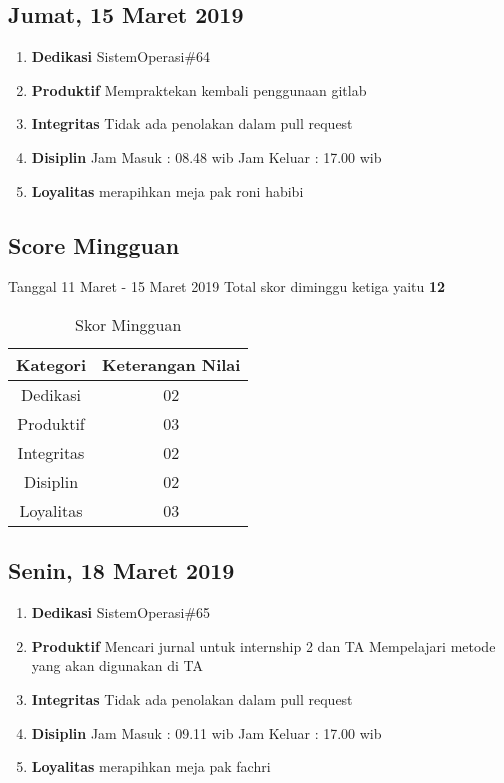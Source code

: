 \subsection{Jumat, 15 Maret 2019}
\begin{enumerate}
\item \textbf{Dedikasi}
\subitem SistemOperasi\#64
\item \textbf{Produktif}
\subitem Mempraktekan kembali penggunaan gitlab 
\item \textbf{Integritas}
\subitem Tidak ada penolakan dalam pull request
\item \textbf{Disiplin}
\subitem Jam Masuk : 08.48 wib
\subitem Jam Keluar : 17.00 wib
\item \textbf{Loyalitas}
\subitem merapihkan meja pak roni habibi
\end{enumerate}

\subsection{Score Mingguan} 
Tanggal 11 Maret - 15 Maret 2019 Total skor diminggu ketiga yaitu \textbf{12}

\begin{table}[h]
\caption{Skor Mingguan}
\centering
\begin{tabular}{|c|c|}
\hline
\textbf{Kategori}&\textbf{Keterangan Nilai}\\
\hline
Dedikasi&02\\
\hline
Produktif&03\\
\hline
Integritas&02\\
\hline
Disiplin&02\\
\hline
Loyalitas&03\\
\hline
\end{tabular}
\label{table : skor minggu ketiga}
\end{table}

\subsection{Senin, 18 Maret 2019}
\begin{enumerate}
\item \textbf{Dedikasi}
\subitem SistemOperasi\#65
\item \textbf{Produktif}
\subitem Mencari jurnal untuk internship 2 dan TA
\subitem Mempelajari metode yang akan digunakan di TA
\item \textbf{Integritas}
\subitem Tidak ada penolakan dalam pull request
\item \textbf{Disiplin}
\subitem Jam Masuk : 09.11 wib
\subitem Jam Keluar : 17.00 wib
\item \textbf{Loyalitas}
\subitem merapihkan meja pak fachri
\end{enumerate}

